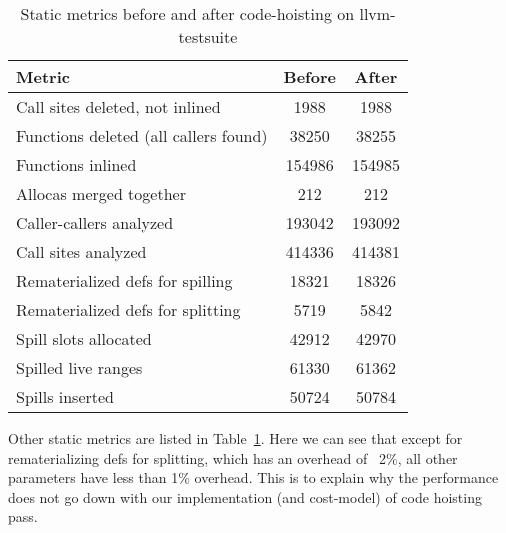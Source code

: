 \documentclass{sig-alternate}
\begin{document}
\begin{table}[h!]
  \begin{center}
    \begin{tabular}{|l|c|c|}
      \hline
      Metric               & Before & After              \\\hline
      Call sites deleted, not inlined             & 1988    & 1988   \\\hline
      Functions deleted (all callers found)       & 38250   & 38255  \\\hline
      Functions inlined                           & 154986  & 154985 \\\hline
      Allocas merged together                     & 212     & 212    \\\hline
      Caller-callers analyzed                     & 193042  & 193092 \\\hline
      Call sites analyzed                         & 414336  & 414381 \\\hline
      Rematerialized defs for spilling            & 18321   & 18326  \\\hline
      Rematerialized defs for splitting           & 5719    & 5842   \\\hline
      Spill slots allocated                       & 42912   & 42970  \\\hline
      Spilled live ranges                         & 61330   & 61362  \\\hline
      Spills inserted                             & 50724   & 50784  \\\hline
\end{tabular}
  \end{center}
  \caption{Static metrics before and after code-hoisting on llvm-testsuite}
  \label{tab:static-results}
\end{table}


Other static metrics are listed in Table~\ref{tab:static-results}. Here we can
see that except for rematerializing defs for splitting, which has an overhead of ~2\%, all
other parameters have less than 1\% overhead. This is to explain why the performance does not
go down with our implementation (and cost-model) of code hoisting pass.
\end{document}
